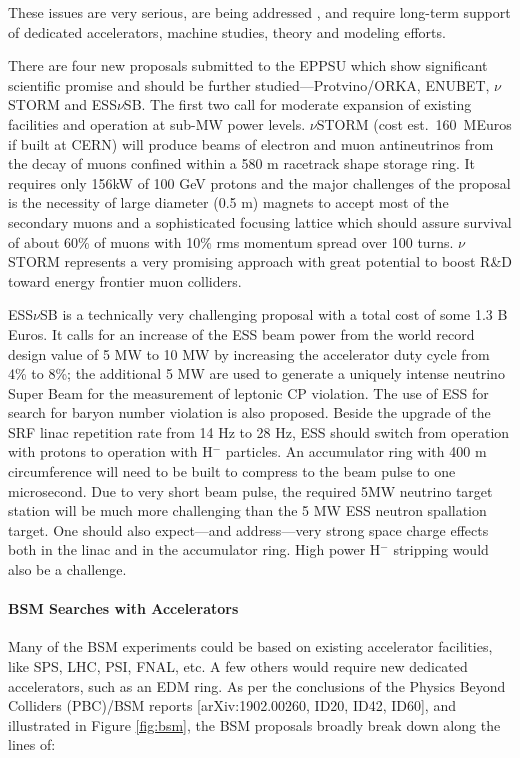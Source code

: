 These issues are very serious, are being addressed \cite{Shiltsev19}, and require long-term support of dedicated accelerators, machine studies, theory and modeling efforts.

There are four new proposals submitted to the EPPSU which show significant scientific promise and should be further studied---Protvino/ORKA, ENUBET, $\nu$STORM and ESS$\nu$SB. The first two call for moderate expansion of existing facilities and operation at sub-MW power levels. $\nu$STORM (cost est.\ 160~MEuros if built at CERN) will produce beams of electron and muon antineutrinos from the decay of muons confined within a 580 m racetrack shape storage ring. It requires only 156kW of 100 GeV protons and the major challenges of the proposal is the necessity of large diameter (0.5 m) magnets to accept most of the secondary muons and a sophisticated focusing lattice which should assure survival of about 60\% of muons with 10\% rms momentum spread over 100 turns. $\nu$STORM represents a very promising approach with great potential to boost R\&D toward energy frontier muon colliders.

ESS$\nu$SB is a technically very challenging proposal with a total cost of some 1.3 B Euros. It calls for an increase of the ESS beam power from the world record design value of 5 MW to 10 MW by increasing the accelerator duty cycle from 4\% to 8\%; the additional 5 MW are used to generate a uniquely intense neutrino Super Beam for the measurement of leptonic CP violation. The use of ESS \cite{id164} for search for baryon number violation \cite{id156} is also proposed. Beside the upgrade of the SRF linac repetition rate from 14 Hz to 28 Hz, ESS should switch from operation with protons to operation with H$^-$ particles. An accumulator ring with 400 m circumference will need to be built to compress to the beam pulse to one microsecond. Due to very short beam pulse, the required 5MW neutrino target station will be much more challenging than the 5 MW ESS neutron spallation target. One should also expect---and address---very strong space charge effects both in the linac and in the accumulator ring. High power H$^-$ stripping would also be a challenge.


\paragraph*{BSM Searches with Accelerators}

Many of the BSM experiments could be based on existing accelerator facilities, like SPS, LHC, PSI, FNAL, etc. A few others would require new dedicated accelerators, such as an EDM ring. As per the conclusions of the Physics Beyond Colliders (PBC)/BSM reports [arXiv:1902.00260, ID20, ID42, ID60], and illustrated in Figure \ref{fig:bsm},  the BSM proposals broadly break down along the lines of:

